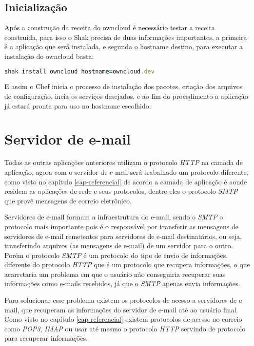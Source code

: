 \subsection{Inicialização}

Após a construção da receita do owncloud é necessário testar a receita construída,
para isso o Shak precisa de duas informações importantes, a primeira é a aplicação
que será instalada, e segunda o hostname destino, para executar a instalação
do owncloud basta:

\begin{lstlisting}[language=Ruby,label=dice_index,caption={Exemplo de execução de instalação do owncloud com shak}]
shak install owncloud hostname=owncloud.dev
\end{lstlisting}

E assim o Chef inicia o processo de instalação dos pacotes, criação dos arquivos
de configuração, incia os serviços desejados, e ao fim do procedimento a aplicação
já estará pronta para uso no hostname escolhido.


\section{Servidor de e-mail}
\label{sub:e-mail}

Todas as outras aplicações anteriores utilizam o protocolo
\textit{HTTP} na camada de aplicação, agora com o servidor de e-mail será trabalhado um
protocolo diferente, como visto no capítulo \ref{cap-referencial}
de acordo \cite{kurose2010redes} a camada de aplicação é aonde residem as aplicações
de rede e seus protocolos, dentre eles o protocolo \textit{SMTP} que provê mensagens de correio
eletrônico.

Servidores de e-mail formam a infraestrutura do e-mail, sendo o \textit{SMTP} o protocolo
mais importante pois é o responsável por transferir as mensagens de servidores
de e-mail remetentes para servidores de e-mail destinatários, ou seja, transferindo
arquivos (as mensagens de e-mail) de um servidor para o outro. Porém o protocolo
\textit{SMTP} é um protocolo do tipo de envio de informações, diferente do protocolo \textit{HTTP}
que é um protocolo que recupera informações, o que acarretaria um problema em que
o usuário não conseguiria recuperar suas informações como e-mails recebidos, já
que o \textit{SMTP} apenas envia informações.

Para solucionar esse problema existem os protocolos de acesso a servidores de
e-mail, que recuperam as informações do servidor de e-mail até ao usuário final.
Como visto no capítulo \ref{cap-referencial} existem protocolos de acesso ao correio
como \textit{POP3}, \textit{IMAP} ou usar até mesmo o protocolo \textit{HTTP} servindo de protocolo para recuperar
informações.

